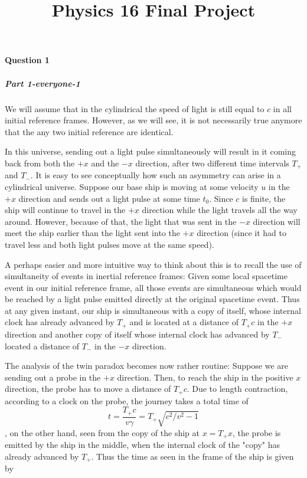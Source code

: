 \title{Physics 16 Final Project}
\newcommand{\f}{\frac} 
\newcommand{\om}{\omega}
\newcommand{\pdif}[2]{\f{\partial #1}{\partial #2}}
\newcommand{\dif}[2]{\f{d#1}{d#2}}
\newcommand{\eqdef}{\equiv}

\paragraph{Question 1}
\subparagraph*{Part 1-everyone-1}
We will assume that in the cylindrical the speed of light is still equal to $c$ in all initial reference frames. However, as we will see, it is not necessarily true anymore that the any two initial reference are identical.  \par 
In this universe, sending out a light pulse simultaneously will result in it coming back from both the $+x$ and the $-x$ direction, after two different time intervals $T_+$ and $T_-$. It is easy to see conceptually how such an asymmetry can arise in a cylindrical universe. Suppose our base ship is moving at some velocity $u$ in the $+x$ direction and sends out a light pulse at some time $t_0$. Since $c$ is finite, the ship will continue to travel in the $+x$ direction while the light travels all the way around. However, because of that, the light that was sent in the $-x$ direction will meet the ship earlier than the light sent into the $+x$ direction (since it had to travel less and both light pulses move at the same speed). \par 
A perhaps easier and more intuitive way to think about this is to recall the use of simultaneity of events in inertial reference frames: Given some local spacetime event in our initial reference frame, all those events are simultaneous which would be reached by a light pulse emitted directly at the original spacetime event. Thus at any given instant, our ship is simultaneous with a copy of itself, whose internal clock has already advanced by $T_+$ and is located at a distance of $T_+c$ in the $+x$ direction and another copy of itself whose internal clock has advanced by $T_-$ located a distance of $T_-$ in the $-x$ direction. \par 
The analysis of the twin paradox becomes now rather routine: Suppose we are sending out a probe in the $+x$ direction. Then, to reach the ship in the positive $x$ direction, the probe has to move a distance of $T_+c$. Due to length contraction, according to a clock on the probe, the journey takes a total time of \[t=\frac{T_+c}{v\gamma} = T_+\sqrt{c^2/v^2-1}\], on the other hand, seen from the copy of the ship at $x=T_+x$, the probe is emitted by the ship in the middle, when the internal clock of the "copy" has already advanced by $T_+$. Thus the time as seen in the frame of the ship is given by
